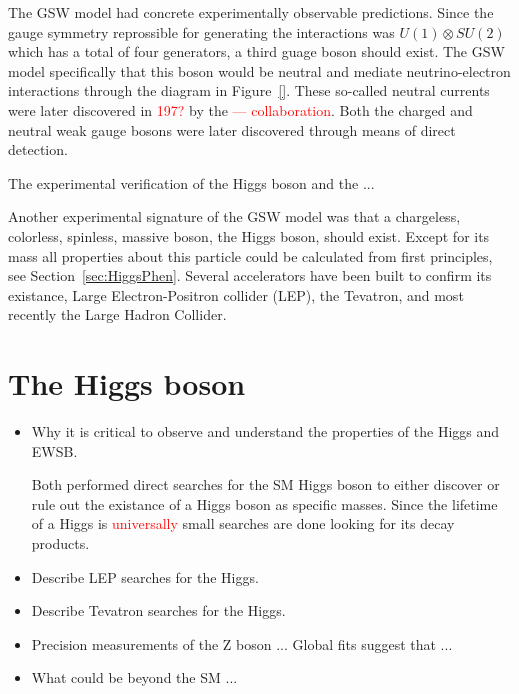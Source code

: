 The GSW model had concrete experimentally observable predictions.  Since
the gauge symmetry reprossible for generating the interactions was
$U(1)\otimes SU(2)$ which has a total of four generators, a third guage 
boson should exist.  The GSW model specifically that this boson would 
be neutral and mediate neutrino-electron interactions through the 
diagram in Figure~\ref{}.  These so-called neutral currents were later
discovered in \textcolor{red}{197?} by the \textcolor{red}{--- collaboration}.
Both the charged and neutral weak gauge bosons were later discovered
through means of direct detection\cite{}.  

The experimental verification of the Higgs boson and the ...

Another experimental signature of the GSW model was that a chargeless,
colorless, spinless, massive boson, the Higgs boson, should exist.  
Except for its mass all properties about this particle could be calculated
from first principles, see Section~\ref{sec:HiggsPhen}.  Several accelerators
have been built to confirm its existance, Large Electron-Positron collider (LEP), 
the Tevatron, and most recently the Large Hadron Collider.  

\section{The Higgs boson}
\label{sec:The Higgs boson}

\begin{itemize}
\item Why it is critical to observe and understand the properties of the Higgs
and EWSB.

Both performed direct searches for the SM Higgs boson to either 
discover or rule out the existance of a Higgs boson as specific
masses.  Since the lifetime of a Higgs is \textcolor{red}{universally}
small searches are done looking for its decay products.  

\item Describe LEP searches for the Higgs.

\item Describe Tevatron searches for the Higgs.

\item Precision measurements of the Z boson ...
Global fits suggest that ... 

\item What could be beyond the SM ...

\end{itemize}

